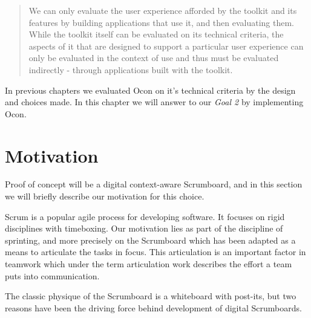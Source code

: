 \documentclass[../report.tex]{subfiles}
\begin{document}
\graphicspath{{img/}{../img/}}




\blockquote{
We can only evaluate the user experience afforded by the toolkit and its features by building applications that use it, and then evaluating them. While the toolkit itself can be evaluated on its technical criteria, the aspects of it that are designed to support a particular user experience can only be evaluated in the context of use and thus must be evaluated indirectly - through applications built with the toolkit. \cite{Infrastructure (2003)} \\}

In previous chapters we evaluated Ocon on it's technical criteria by the design and choices made. In this chapter we will answer to our \textit{Goal 2} by implementing Ocon.

\section{Motivation}

Proof of concept will be a digital context-aware Scrumboard, and in this section we will briefly describe our motivation for this choice.





Scrum is a popular agile process for developing software. It focuses on rigid disciplines with timeboxing. Our motivation lies as part of the discipline of sprinting, and more precisely on the Scrumboard which has been adapted as a means to articulate the tasks in focus. This articulation is an important factor in teamwork which under the term articulation work describes the effort a team puts into communication.

The classic physique of the Scrumboard is a whiteboard with post-its, but two reasons have been the driving force behind development of digital Scrumboards.
\end{document}
